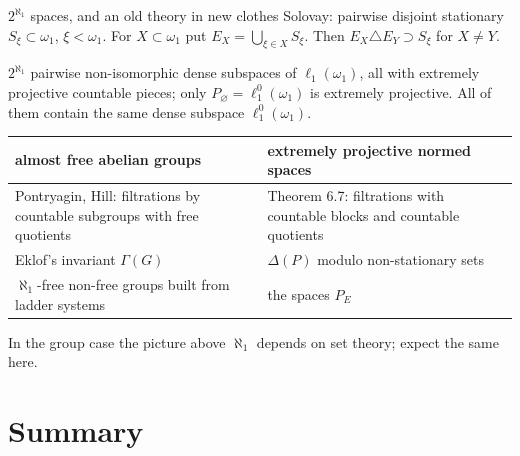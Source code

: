 \documentclass[10pt,aspectratio=169]{beamer}
\newcommand{\lo}[1]{\ell_1^0(#1)}
\newcommand{\ellone}[1]{\ell_1(#1)}
\begin{document}
\begin{frame}{$2^{\aleph_1}$ spaces, and an old theory in new clothes}
  Solovay: pairwise disjoint stationary $S_\xi\subset\omega_1$, $\xi<\omega_1$. For
  $X\subset\omega_1$ put $E_X=\bigcup_{\xi\in X}S_\xi$. Then $E_X\triangle E_Y\supset S_\xi$
  for $X\ne Y$.
  \begin{alertblock}{}
    $2^{\aleph_1}$ pairwise non-isomorphic dense subspaces of $\ellone{\omega_1}$,
    all with extremely projective countable pieces; only $P_\varnothing=\lo{\omega_1}$
    is extremely projective. All of them contain the same dense subspace $\lo{\omega_1}$.
  \end{alertblock}
  \medskip
  {\small
  \renewcommand{\arraystretch}{1.2}
  \begin{tabular}{@{}p{}p{}@{}}
    \toprule
    almost free abelian groups & extremely projective normed spaces\\
    \midrule
    Pontryagin, Hill: filtrations by countable subgroups with free quotients
      & Theorem 6.7: filtrations with countable blocks and countable quotients\\
    Eklof's invariant $\Gamma(G)$ & $\Delta(P)$ modulo non-stationary sets\\
    $\aleph_1$-free non-free groups built from ladder systems & the spaces $P_E$\\
    \bottomrule
  \end{tabular}}
  \medskip

  In the group case the picture above $\aleph_1$ depends on set theory; expect
  the same here.
\end{frame}

\section{Summary}
\end{document}
